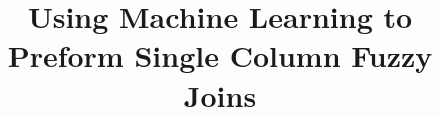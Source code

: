 \documentclass{vldb}
\begin{document}

\title{Using Machine Learning to Preform Single Column Fuzzy Joins}



%
%
%
%

\end{document}
